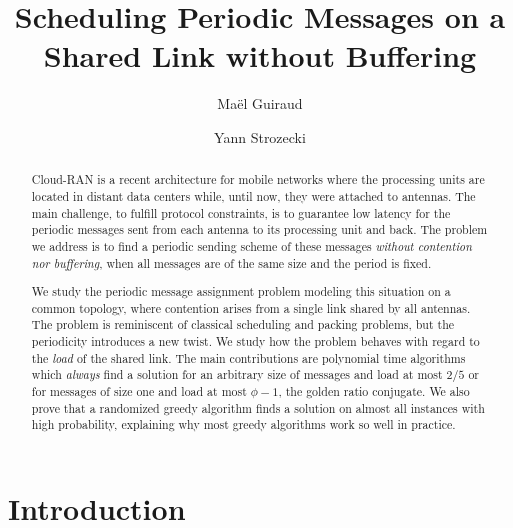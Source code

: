 \documentclass[a4paper,UKenglish,cleveref, autoref, thm-restate]{lipics-v2019}
\title{Scheduling Periodic Messages on a Shared Link without Buffering} %
\author{Ma\"el Guiraud}{LINEACT Laboratory, Campus CESI Nanterre - Paris 
93 boulevard de la Seine 
BP 602 Cedex 92006 Nanterre , France}{mguiraud@cesi.fr}{https://orcid.org/0000-0002-0497-6233 
}{}
\author{Yann Strozecki}{DAVID Laboratory, Université de Versailles-Saint-Quentin, 45 Avenue des Etats-Unis, Versailles, France }{yann.strozecki@uvsq.fr}{https://orcid.org/0000-0002-0891-3766}{}%
\begin{document}
\maketitle


\begin{abstract}
Cloud-RAN is a recent architecture for mobile networks where the processing units are located in distant data centers while, until now, they were attached to antennas. The main challenge, to fulfill protocol constraints, is to guarantee low latency for the periodic messages sent from each antenna to its processing unit and back. The problem we address is to find a periodic sending scheme of these messages \emph{without contention nor buffering}, when all messages are of the same size and the period is fixed.

We study the periodic message assignment problem modeling this situation on a common topology, where contention arises from a single link shared by all antennas. The problem is reminiscent of classical scheduling and packing problems, but the periodicity introduces a new twist. We study how the problem behaves with regard to the \emph{load} of the shared link. 
The main contributions are polynomial time algorithms which \emph{always} find a solution for an arbitrary size of messages and load at most $2/5$ or for messages of size one and load at most $\phi - 1$, the golden ratio conjugate. We also prove that a randomized greedy algorithm finds a solution on almost all instances with high probability, explaining why most greedy algorithms work so well in practice.
\end{abstract}


\section{Introduction}
\end{document}
